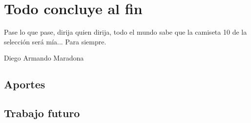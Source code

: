 \chapter{Todo concluye al fin}
\epigraph{Pase lo que pase, dirija quien dirija, todo el mundo sabe que la
camiseta 10 de la selecci\'on ser\'a m\'ia... Para siempre.}%
{Diego Armando Maradona}

\section{Aportes}



\section{Trabajo futuro}